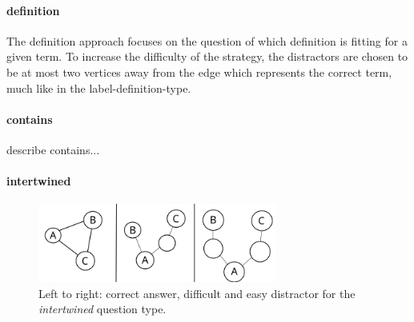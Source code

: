 \documentclass{IOS-Book-Article}     %
\begin{document}
\paragraph{definition}
The definition approach focuses on the question of which definition is fitting for a given term. 
To increase the difficulty of the strategy, the distractors are chosen to be at most two vertices away from the edge which represents the correct term, much like in the label-definition-type.

\paragraph{contains}
describe contains...

\paragraph{intertwined}

\begin{figure}
\includegraphics[width=0.7\textwidth]{img/intertwined_cml.png} 
\caption{Left to right: correct answer, difficult and easy distractor for the \emph{intertwined} question type.}
\label{fig:intertwined}
\end{figure}
\end{document}
